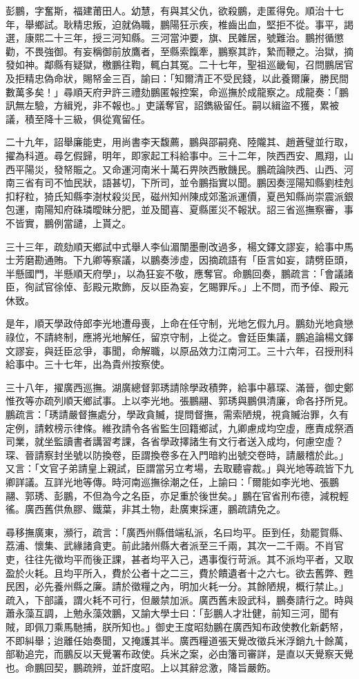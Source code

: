 \begin{pinyinscope}
彭鵬，字奮斯，福建莆田人。幼慧，有與其父仇，欲殺鵬，走匿得免。順治十七年，舉鄉試。耿精忠叛，迫就偽職，鵬陽狂示疾，椎齒出血，堅拒不從。事平，謁選，康熙二十三年，授三河知縣。三河當沖要，旗、民雜居，號難治。鵬拊循懲勸，不畏強御。有妄稱御前放鷹者，至縣索餼牽，鵬察其詐，縶而鞭之。治獄，摘發如神。鄰縣有疑獄，檄鵬往鞫，輒白其冤。二十七年，聖祖巡畿甸，召問鵬居官及拒精忠偽命狀，賜帑金三百，諭曰：「知爾清正不受民錢，以此養爾廉，勝民間數萬多矣！」尋順天府尹許三禮劾鵬匿報控案，命巡撫於成龍察之。成龍奏：「鵬訊無左驗，方緝兇，非不報也。」吏議奪官，詔鐫級留任。嗣以緝盜不獲，累被議，積至降十三級，俱從寬留任。

二十九年，詔舉廉能吏，用尚書李天馥薦，鵬與邵嗣堯、陸隴其、趙蒼璧並行取，擢為科道。尋乞假歸，明年，即家起工科給事中。三十二年，陜西西安、鳳翔，山西平陽災，發帑賑之。又命運河南米十萬石畀陜西散饑民。鵬疏論陜西、山西、河南三省有司不恤民狀，語甚切，下所司，並令鵬指實以聞。鵬因奏涇陽知縣劉桂剋扣籽粒，猗氏知縣李澍杖殺災民，磁州知州陳成郊濫派運價，夏邑知縣尚崇震派銀包運，南陽知府硃璘曖昧分肥，並及聞喜、夏縣匿災不報狀。詔三省巡撫察審，事不皆實，鵬例當譴，上貰之。

三十三年，疏劾順天鄉試中式舉人李仙湄闈墨刪改過多，楊文鐸文謬妄，給事中馬士芳磨勘通賄。下九卿等察議，以鵬奏涉虛，因摘疏語有「臣言如妄，請劈臣頭，半懸國門，半懸順天府學」，以為狂妄不敬，應奪官。命鵬回奏，鵬疏言：「會議諸臣，徇試官徐倬、彭殿元欺飾，反以臣為妄，乞賜罪斥。」上不問，而予倬、殿元休致。

是年，順天學政侍郎李光地遭母喪，上命在任守制，光地乞假九月。鵬劾光地貪戀祿位，不請終制，應將光地解任，留京守制，上從之。會廷臣集議，鵬追論楊文鐸文謬妄，與廷臣忿爭，事聞，命解職，以原品效力江南河工。三十六年，召授刑科給事中。三十七年，出為貴州按察使。

三十八年，擢廣西巡撫。湖廣總督郭琇請除學政積弊，給事中慕琛、滿晉，御史鄭惟孜等亦疏列順天鄉試事。上以李光地。張鵬翮、郭琇與鵬俱清廉，命各抒所見。鵬疏言：「琇請嚴督撫處分，學政貪贓，提問督撫，需索陋規，視貪贓治罪，久有定例，請敕榜示律條。維孜請令各省監生回籍鄉試，九卿慮成均空虛，應責成祭酒司業，就坐監讀書者講習考課，各省學政擇諸生有文行者送入成均，何慮空虛？琛、晉請察封坐號以防換卷，臣謂換卷多在入門暗約出號交卷時，請嚴稽於此。」又言：「文官子弟請皇上親試，臣謂當另立考場，去取聽睿裁。」與光地等疏皆下九卿詳議。互詳光地等傳。時河南巡撫徐潮之任，上諭曰：「爾能如李光地、張鵬翮、郭琇、彭鵬，不但為今之名臣，亦足重於後世矣。」鵬在官省刑布德，減稅輕徭。廣西舊供魚膠、鐵葉，非其土物，赴廣東採運，鵬疏請免之。

尋移撫廣東，瀕行，疏言：「廣西州縣借端私派，名曰均平。臣到任，劾罷賀縣、荔浦、懷集、武緣諸貪吏。前此諸州縣大者派至三千兩，其次一二千兩。不肖官吏，往往先徵均平而後正課，甚者均平入己，遇事復行苛派。其不派均平者，又取盈於火耗。且均平所入，費於公者十之二三，費於饋遺者十之六七。欲去舊弊、甦民困，必先養州縣之廉。請於徵糧之內，明加火耗一分。其餘陋規，概行禁止。」疏入，下部議，謂火耗不可行，但嚴禁加派。廣西舊未設武科，鵬奏請行之。時與蕭永藻互調，上勉永藻效鵬，又諭大學士曰：「彭鵬人才壯健，前知三河，聞有賊，即佩刀乘馬馳捕，朕所知也。」御史王度昭劾鵬在廣西知布政使教化新虧帑，不即糾舉；迨離任始奏聞，又掩護其半。廣西糧道張天覺改徵兵米浮銷九十餘萬，部勒追完，而鵬反以天覺署布政使。兵米之案，必由籓司審詳，是直以天覺察天覺也。命鵬回契，鵬疏辨，並訐度昭。上以其辭忿激，降旨嚴飭。


\end{pinyinscope}
